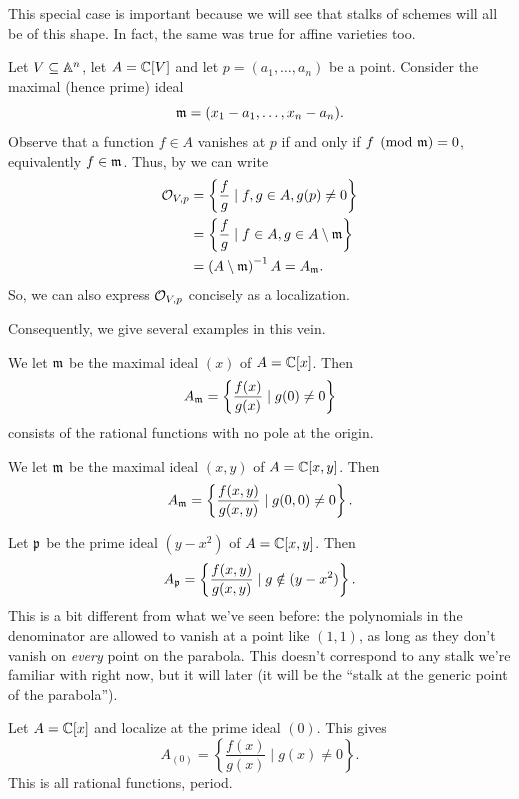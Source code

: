 This special case is important because we will see that
stalks of schemes will all be of this shape.
In fact, the same was true for affine varieties too.
\begin{example}
	Let $V \subseteq \mathbb A^n$, let $A = \mathbb C[V]$
	and let $p = (a_1, \dots, a_n)$ be a point.
	Consider the maximal (hence prime) ideal
	\[ \mathfrak m = (x_1 - a_1, \dots, x_n - a_n). \]
	Observe that a function $f \in A$ vanishes at $p$
	if and only if $f \pmod{\mathfrak m} = 0$, equivalently $f \in \mathfrak m$.
	Thus, by  we can write
	\begin{align*}
		\mathcal O_{V,p} &= \left\{ \frac{f}{g} \mid f,g \in A, g(p) \neq 0 \right\} \\
		&= \left\{ \frac{f}{g} \mid f \in A, g \in A \setminus \mathfrak m \right\} \\
		&= \left( A \setminus \mathfrak m \right)^{-1} A = A_\mathfrak m.
	\end{align*}
	So, we can also express $\mathcal O_{V,p}$ concisely as a localization.
\end{example}
Consequently, we give several examples in this vein.

\begin{example}
	\listhack
	\begin{enumerate}[(a)]
		\ii We let $\mathfrak m$ be the maximal ideal $(x)$ of $A = \mathbb C[x]$.
		Then \[ A_\mathfrak m = \left\{ \frac{f(x)}{g(x)} \mid g(0) \neq 0 \right\} \]
		consists of the rational functions with no pole at the origin.

		\ii We let $\mathfrak m$ be the maximal ideal $(x,y)$ of $A = \mathbb C[x,y]$.
		Then \[ A_\mathfrak m = \left\{ \frac{f(x,y)}{g(x,y)} \mid g(0,0) \neq 0 \right\}. \]

		\ii Let $\mathfrak p$ be the prime ideal $(y-x^2)$ of $A = \mathbb C[x,y]$.
		Then
		\[ A_\mathfrak p = \left\{ \frac{f(x,y)}{g(x,y)} \mid g \notin (y-x^2) \right\}. \]
		This is a bit different from what we've seen before:
		the polynomials in the denominator are allowed to vanish
		at a point like $(1,1)$, as long as they don't vanish on
		\emph{every} point on the parabola.
		This doesn't correspond to any stalk we're familiar with right now,
		but it will later
		(it will be the ``stalk at the generic point of the parabola'').

		\ii Let $A = \mathbb C[x]$ and localize at the prime ideal $(0)$.
		This gives \[ A_{(0)} = \left\{ \frac{f(x)}{g(x)} \mid g(x) \neq 0 \right\}. \]
		This is all rational functions, period.
	\end{enumerate}
\end{example}

